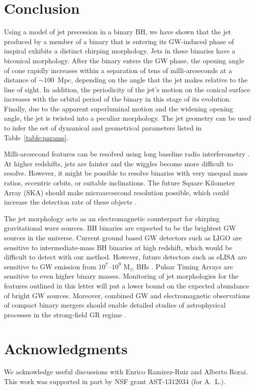 \documentclass[a4paper,fleqn,usenatbib]{mnras}
\begin{document}
\section{Conclusion}

Using a model of jet precession in a binary BH, we have shown that the
jet produced by a member of a binary that is entering its GW-induced
phase of inspiral exhibits a distinct chirping morphology.  Jets in
these binaries have a biconical morphology.  After the binary enters
the GW phase, the opening angle of cone rapidly increases within a
separation of tens of milli-arcseconds at a distance of $\sim
100$~Mpc, depending on the angle that the jet makes relative to the
line of sight.  In addition, the periodicity of the jet's motion on
the conical surface increases with the orbital period of the binary in
this stage of its evolution.  Finally, due to the apparent
superluminal motion and the widening opening angle, the jet is twisted
into a peculiar morphology.  The jet geometry can be used to infer the
set of dynamical and geometrical parameters listed in
Table~\ref{table:params}.

Milli-arcsecond features can be resolved using long baseline radio
interferometry \citep{2001ChJAA...1..236Q}.  At higher redshifts, jets
are fainter and the wiggles become more difficult to resolve.
However, it might be possible to resolve binaries with very unequal
mass ratios, eccentric orbits, or suitable inclinations.  The future
Square Kilometer Array (SKA) should make microarcsecond resolution
possible, which could increase the detection rate of these objects
\citep{2014arXiv1412.5971P}.

The jet morphology acts as an electromagnetic counterpart for chirping
gravitational wave sources.  BH binaries are expected to be the
brightest GW sources in the universe.  Current ground based GW
detectors such as LIGO are sensitive to intermediate-mass BH binaries
at high redshift, which would be difficult to detect with our method.
However, future detectors such as eLISA are sensitive to GW emission
from $10^7$--$10^9$ M$_\odot$ BHs \citep{2013CQGra..30x4009S}.  Pulsar
Timing Arrays are sensitive to even higher binary masses.  Monitoring
of jet morphologies for the features outlined in this letter will put
a lower bound on the expected abundance of bright GW
sources. Moreover, combined GW and electromagnetic observations of
compact binary mergers should enable detailed studies of astrophysical
processes in the strong-field GR regime \citep{2005ApJ...629...15H}.

\section*{Acknowledgments}

We acknowledge useful discussions with Enrico Ramirez-Ruiz and Alberto
Rorai.  This work was supported in part by NSF grant AST-1312034 (for
A.~L.).


 

\bsp
\label{lastpage}
\end{document}
